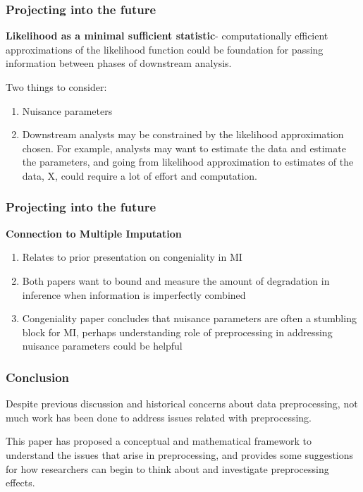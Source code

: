 \documentclass[10pt, compress]{beamer}
\begin{document}
\begin{frame}[fragile]
    \frametitle{Projecting into the future}
    
    \textbf{Likelihood as a minimal sufficient statistic}- computationally efficient approximations of the likelihood function could be foundation for passing information between phases of downstream analysis.  
    
    Two things to consider:
    \begin{enumerate}
    \item Nuisance parameters 
    \item Downstream analysts may be constrained by the likelihood approximation chosen. For example, analysts may want to estimate the data and estimate the parameters, and going from likelihood approximation to estimates of the data, X, could require a lot of effort and computation.
    \end{enumerate}

\end{frame}

\begin{frame}[fragile]
    \frametitle{Projecting into the future}
    
    \textbf{Connection to Multiple Imputation} 
    
    \begin{enumerate}
    \item Relates to prior presentation on congeniality in MI
    \item Both papers want to bound and measure the amount of degradation in inference when information is imperfectly combined
    \item Congeniality paper concludes that nuisance parameters are often a stumbling block for MI, perhaps understanding role of preprocessing in addressing nuisance parameters could be helpful
    \end{enumerate}
    
\end{frame}

\begin{frame}[fragile]
    \frametitle{Conclusion}
    
    Despite previous discussion and historical concerns about data preprocessing, not much work has been done to address issues related with preprocessing.
    
    \vspace*{3mm}
    
    This paper has proposed a conceptual and mathematical framework to understand the issues that arise in preprocessing, and provides some suggestions for how researchers can begin to think about and investigate preprocessing effects. 
  
\end{frame}
\end{document}
